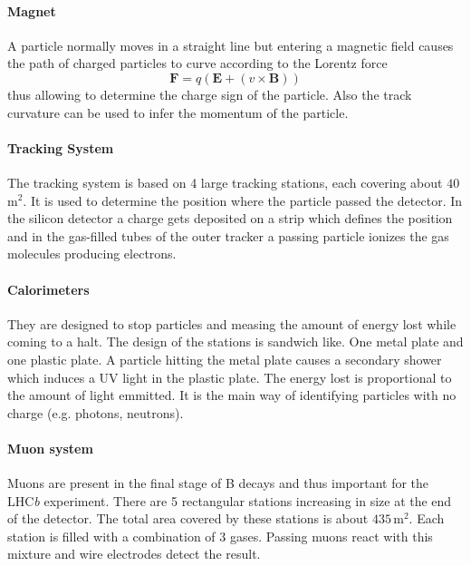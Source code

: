 \documentclass[11pt,twoside]{scrreprt}
\begin{document}
\paragraph{Magnet} A particle normally moves in a straight line but entering a magnetic field causes the path of charged particles to curve according to the Lorentz force \[
  \mathbf{F} = q\left( \mathbf{E} + \left( v\times\mathbf{B}\right)\right)
\]
thus allowing to determine the charge sign of the particle. Also the track curvature can be used to infer the momentum of the particle.

\paragraph{Tracking System} The tracking system is based on 4 large tracking stations, each covering about $40$\,m$^2$. It is used to determine the position where the particle passed the detector. In the silicon detector a charge gets deposited on a strip which defines the position and in the gas-filled tubes of the outer tracker a passing particle ionizes the gas molecules producing electrons.

\paragraph{Calorimeters} They are designed to stop particles and measing the amount of energy lost while coming to a halt. The design of the stations is sandwich like. One metal plate and one plastic plate. A particle hitting the metal plate causes a secondary shower which induces a UV light in the plastic plate. The energy lost is proportional to the amount of light emmitted. It is the main way of identifying particles with no charge (e.g. photons, neutrons).

\paragraph{Muon system}
Muons are present in the final stage of B decays and thus important for the LHC\textit{b} experiment. There are 5 rectangular stations increasing in size at the end of the detector. The total area covered by these stations is about $435$\,m$^2$. Each station is filled with a combination of 3 gases. Passing muons react with this mixture and wire electrodes detect the result.
\end{document}
